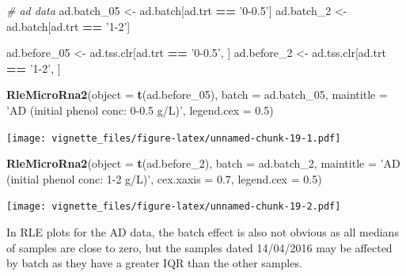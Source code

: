 \documentclass[]{book}
\newenvironment{Shaded}{\begin{snugshade}}{\end{snugshade}}
\newcommand{\KeywordTok}[1]{\textcolor[rgb]{0.13,0.29,0.53}{\textbf{#1}}}
\newcommand{\DataTypeTok}[1]{\textcolor[rgb]{0.13,0.29,0.53}{#1}}
\newcommand{\DecValTok}[1]{\textcolor[rgb]{0.00,0.00,0.81}{#1}}
\newcommand{\FloatTok}[1]{\textcolor[rgb]{0.00,0.00,0.81}{#1}}
\newcommand{\StringTok}[1]{\textcolor[rgb]{0.31,0.60,0.02}{#1}}
\newcommand{\CommentTok}[1]{\textcolor[rgb]{0.56,0.35,0.01}{\textit{#1}}}
\newcommand{\OperatorTok}[1]{\textcolor[rgb]{0.81,0.36,0.00}{\textbf{#1}}}
\newcommand{\NormalTok}[1]{#1}
\begin{document}
\begin{Shaded}
\begin{Highlighting}[]
\CommentTok{# ad data}
\NormalTok{ad.batch_}\DecValTok{05}\NormalTok{ <-}\StringTok{ }\NormalTok{ad.batch[ad.trt }\OperatorTok{==}\StringTok{ '0-0.5'}\NormalTok{]}
\NormalTok{ad.batch_}\DecValTok{2}\NormalTok{ <-}\StringTok{ }\NormalTok{ad.batch[ad.trt }\OperatorTok{==}\StringTok{ '1-2'}\NormalTok{] }

\NormalTok{ad.before_}\DecValTok{05}\NormalTok{ <-}\StringTok{ }\NormalTok{ad.tss.clr[ad.trt }\OperatorTok{==}\StringTok{ '0-0.5'}\NormalTok{, ]}
\NormalTok{ad.before_}\DecValTok{2}\NormalTok{ <-}\StringTok{ }\NormalTok{ad.tss.clr[ad.trt }\OperatorTok{==}\StringTok{ '1-2'}\NormalTok{, ]}

\KeywordTok{RleMicroRna2}\NormalTok{(}\DataTypeTok{object =} \KeywordTok{t}\NormalTok{(ad.before_}\DecValTok{05}\NormalTok{), }\DataTypeTok{batch =}\NormalTok{ ad.batch_}\DecValTok{05}\NormalTok{, }
             \DataTypeTok{maintitle =} \StringTok{'AD (initial phenol conc: 0-0.5 g/L)'}\NormalTok{, }
             \DataTypeTok{legend.cex =} \FloatTok{0.5}\NormalTok{)}
\end{Highlighting}
\end{Shaded}

\texttt{[image: vignette\_files/figure-latex/unnamed-chunk-19-1.pdf]}

\begin{Shaded}
\begin{Highlighting}[]
\KeywordTok{RleMicroRna2}\NormalTok{(}\DataTypeTok{object =} \KeywordTok{t}\NormalTok{(ad.before_}\DecValTok{2}\NormalTok{), }\DataTypeTok{batch =}\NormalTok{ ad.batch_}\DecValTok{2}\NormalTok{, }
             \DataTypeTok{maintitle =} \StringTok{'AD (initial phenol conc: 1-2 g/L)'}\NormalTok{, }
             \DataTypeTok{cex.xaxis =} \FloatTok{0.7}\NormalTok{, }\DataTypeTok{legend.cex =} \FloatTok{0.5}\NormalTok{)}
\end{Highlighting}
\end{Shaded}

\texttt{[image: vignette\_files/figure-latex/unnamed-chunk-19-2.pdf]}

In RLE plots for the AD data, the batch effect is also not obvious as
all medians of samples are close to zero, but the samples dated
14/04/2016 may be affected by batch as they have a greater IQR than the
other samples.
\end{document}
